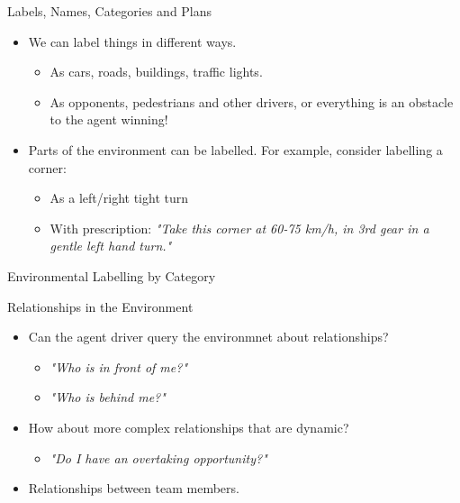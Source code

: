\documentclass[aspectratio=1610,xcolor=dvipsnames,t]{beamer}
\begin{document}
\begin{frame}{Labels, Names, Categories and Plans}
    \begin{itemize}
        \item We can label things in different ways.
            \begin{itemize}
                \item As cars, roads, buildings, traffic lights.
                \item As opponents, pedestrians and other drivers, 
                      or everything is an obstacle to the 
                      agent winning!
            \end{itemize}
        \item Parts of the environment can be labelled. 
              For example, consider labelling a corner:
              \begin{itemize}
                    \item As a left/right tight turn
                    \item With prescription: \emph{"Take this corner
                            at 60-75 km/h, in 3rd gear in a gentle
                        left hand turn."} 
              \end{itemize}
    \end{itemize}
\end{frame} 

\begin{frame}{Environmental Labelling by Category} 
\end{frame}

\begin{frame}{Relationships in the Environment}
    \begin{itemize}
        \item Can the agent driver query the environmnet about 
              relationships?
              \begin{itemize}
                \item \emph{"Who is in front of me?"}
                \item \emph{"Who is behind me?"} 
              \end{itemize}
        \item How about more complex relationships that are dynamic?
            \begin{itemize}
                \item \emph{"Do I have an overtaking opportunity?"}
            \end{itemize}
        \item Relationships between team members.
    \end{itemize}
\end{frame}
\end{document}
